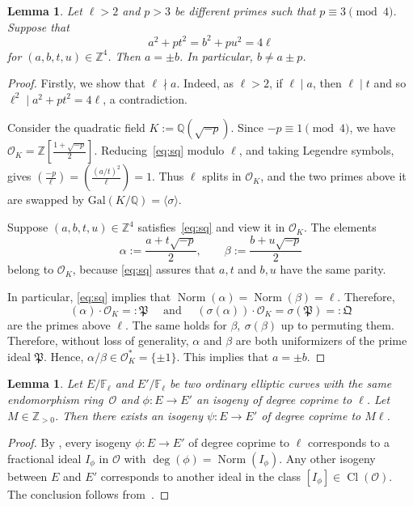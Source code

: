 \documentclass[12pt]{amsart}
\numberwithin{equation}{section}
\newtheorem{lemma}[equation]{Lemma}
\theoremstyle{definition}
\newcommand{\F}{\mathbb{F}}
\newcommand{\Q}{\mathbb{Q}}
\newcommand{\Z}{\mathbb{Z}}
\newcommand{\Gal}{\text{Gal}}
\DeclareMathOperator{\Norm}{ Norm}
\DeclareMathOperator{\Cl}{Cl}
\newcommand{\cO}{\mathcal{O}}
\begin{document}
\begin{lemma}\label{lem:kraus}
    Let $\ell > 2$ and $p>3$ be different primes such that $p \equiv 3 \pmod 4$. 
    Suppose that 
    \begin{equation}\label{eq:sq}
    a^2+pt^2=b^2+pu^2 = 4 \ell
    \end{equation}
    for $(a,b,t,u)\in \Z^4$. Then $a=\pm b$. In particular, $b \neq a\pm p$.
\end{lemma}
\begin{proof}
Firstly, we show that $\ell \nmid a$. Indeed, as $\ell > 2$, if $\ell \mid a$, then 
$\ell \mid t$ and so $\ell^2 \mid a^2 + pt^2 = 4\ell$, a contradiction.  

Consider the quadratic field $K:=\Q(\sqrt{-p})$. Since $-p\equiv 1 \pmod 4$, we have $\cO_K =\Z[\frac{1+\sqrt{-p}}{2}]$.
Reducing~\eqref{eq:sq} modulo $\ell$, and taking Legendre symbols, gives $\left(\frac{-p}{\ell}\right)=\left( \frac{(a/t)^2}{\ell} \right)=1$. Thus $\ell$ splits in $\cO_K$, and the two primes above it are swapped by $\Gal(K/\Q)=\langle \sigma \rangle$.

Suppose $(a,b,t,u)\in \Z^4$ satisfies~\eqref{eq:sq} and view it in $\cO_K$. The elements
    \[
    \alpha:=\frac{a+t\sqrt{-p}}{2}, \qquad \beta:=\frac{ b+u\sqrt{-p}}{2}
    \]
belong to $\cO_K$, because \eqref{eq:sq} assures that $a, t$ and $b, u$ have the same parity. 

In particular, \eqref{eq:sq} implies that $\Norm(\alpha)=\Norm(\beta)=\ell$. Therefore,  $$(\alpha)\cdot\cO_K =:\mathfrak{P} \quad \text{ and } \quad (\sigma(\alpha))\cdot\cO_K=\sigma(\mathfrak{P})=:\mathfrak{Q}$$
are the primes above $\ell$. The same holds for $\beta,\: \sigma (\beta)$ up to permuting them. Therefore, without loss of generality, $\alpha$ and $\beta$ are both uniformizers of the prime ideal $\mathfrak{P}$. Hence, $\alpha/\beta\in \cO_K^*=\{\pm 1\}$. This implies that $a=\pm b$.
\end{proof}
\begin{lemma}\label{lem:isgprime}
Let $E/\F_\ell$ and $E'/\F_\ell$ be two ordinary elliptic curves with the same endomorphism ring~$\cO$ and $\phi: E \to E'$ an isogeny of degree coprime to $\ell$. Let $M\in \Z_{> 0}$. Then there exists an isogeny $\psi: E \to E'$ of degree coprime to $M\ell$.
\end{lemma}

\begin{proof}
    By \cite[Section 2.8]{Drew},  every isogeny $\phi:E\to E'$ of degree coprime to $\ell$ corresponds to a fractional ideal $I_\phi$ in $\cO$ with $\deg(\phi)=\Norm(I_\phi)$. Any other isogeny between $E$ and $E'$ corresponds to another ideal in the class $[I_\phi]\in \Cl(\cO)$. The conclusion follows from~\cite[Corollary 7.17]{cox}.
\end{proof}
\end{document}
